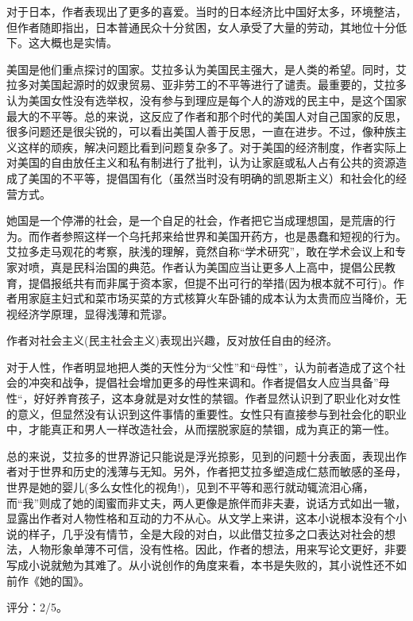 对于日本，作者表现出了更多的喜爱。当时的日本经济比中国好太多，环境整洁，但作者随即指出，日本普通民众十分贫困，女人承受了大量的劳动，其地位十分低下。这大概也是实情。

美国是他们重点探讨的国家。艾拉多认为美国民主强大，是人类的希望。同时，艾拉多对美国起源时的奴隶贸易、亚非劳工的不平等进行了谴责。最重要的，艾拉多认为美国女性没有选举权，没有参与到理应是每个人的游戏的民主中，是这个国家最大的不平等。总的来说，这反应了作者和那个时代的美国人对自己国家的反思，很多问题还是很尖锐的，可以看出美国人善于反思，一直在进步。不过，像种族主义这样的顽疾，解决问题比看到问题复杂多了。对于美国的经济制度，作者实际上对美国的自由放任主义和私有制进行了批判，认为让家庭或私人占有公共的资源造成了美国的不平等，提倡国有化（虽然当时没有明确的凯恩斯主义）和社会化的经营方式。

她国是一个停滞的社会，是一个自足的社会，作者把它当成理想国，是荒唐的行为。而作者参照这样一个乌托邦来给世界和美国开药方，也是愚蠢和短视的行为。艾拉多走马观花的考察，肤浅的理解，竟然自称“学术研究”，敢在学术会议上和专家对喷，真是民科治国的典范。作者认为美国应当让更多人上高中，提倡公民教育，提倡报纸共有而非属于资本家，但提不出可行的举措(因为根本就不可行)。作者用家庭主妇式和菜市场买菜的方式核算火车卧铺的成本认为太贵而应当降价，无视经济学原理，显得浅薄和荒谬。

作者对社会主义(民主社会主义)表现出兴趣，反对放任自由的经济。

对于人性，作者明显地把人类的天性分为“父性”和“母性”，认为前者造成了这个社会的冲突和战争，提倡社会增加更多的母性来调和。作者提倡女人应当具备”母性“，好好养育孩子，这本身就是对女性的禁锢。作者显然认识到了职业化对女性的意义，但显然没有认识到这件事情的重要性。女性只有直接参与到社会化的职业中，才能真正和男人一样改造社会，从而摆脱家庭的禁锢，成为真正的第一性。

总的来说，艾拉多的世界游记只能说是浮光掠影，见到的问题十分表面，表现出作者对于世界和历史的浅薄与无知。另外，作者把艾拉多塑造成仁慈而敏感的圣母，世界是她的婴儿(多么女性化的视角!)，见到不平等和恶行就动辄流泪心痛，而“我”则成了她的闺蜜而非丈夫，两人更像是旅伴而非夫妻，说话方式如出一辙，显露出作者对人物性格和互动的力不从心。从文学上来讲，这本小说根本没有个小说的样子，几乎没有情节，全是大段的对白，以此借艾拉多之口表达对社会的想法，人物形象单薄不可信，没有性格。因此，作者的想法，用来写论文更好，非要写成小说就勉为其难了。从小说创作的角度来看，本书是失败的，其小说性还不如前作《她的国》。

评分：2/5。